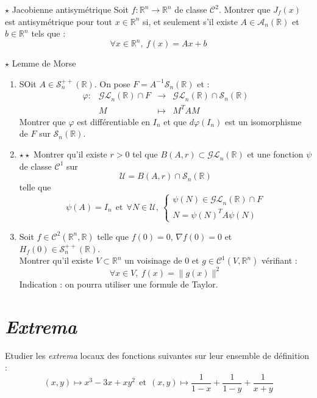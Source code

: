 \documentclass[french,a4paper]{article}
\newcommand{\R}{\mathbb{R}}
\newcommand{\inv}{^{-1}}
\theoremstyle{plain}
\theoremstyle{definition}
\theoremstyle{remark}
\begin{document}
\begin{ex}[Nougayrède / X]{$\star$ Jacobienne antisymétrique}
	Soit $f:\R^n\to\R^n$ de classe $\mathcal{C}^2$. Montrer que $J_f(x)$ est antisymétrique pour tout $x\in\R^n$ si, et seulement s'il existe $A\in\mathcal{A}_n(\R)$ et $b\in\R^n$ tels que : $$\forall x\in\R^n,\ f(x)=Ax+b$$
\end{ex}

\begin{ex}{$\star$ Lemme de Morse}
	\begin{enumerate}
		\item SOit $A\in\mathcal{S}_n^{++}(\R)$. On pose $F=A\inv\mathcal{S}_n(\R)$ et : $$\begin{array}{lrcl}
			\varphi:&\mathcal{GL}_n(\R)\cap F&\longrightarrow&\mathcal{GL}_n(\R)\cap\mathcal{S}_n(\R)\\
			&M&\longmapsto&M^TAM
		\end{array}$$ Montrer que $\varphi$ est différentiable en $I_n$ et que $d\varphi(I_n)$ est un isomorphisme de $F$ sur $\mathcal{S}_n(\R)$.
		\item $\star\star$ Montrer qu'il existe $r>0$ tel que $B(A,r)\subset\mathcal{GL}_n(\R)$ et une fonction $\psi$ de classe $\mathcal{C}^1$ sur $$\mathcal{U}=B(A,r)\cap\mathcal{S}_n(\R)$$ telle que $$\psi(A)=I_n\ \ \text{et}\ \ \forall N\in \mathcal{U},\ \begin{cases}
			\psi(N)\in\mathcal{GL}_n(\R)\cap F\\
			N=\psi(N)^TA\psi(N)
		\end{cases}$$
		\item Soit $f\in\mathcal{C}^2(\R^n,\R)$ telle que $f(0)=0$, $\nabla f(0)=0$ et $H_f(0)\in\mathcal{S}_n^{++}(\R)$. \\
		Montrer qu'il existe $V\subset\R^n$ un voisinage de $0$ et $g\in\mathcal{C}^1(V,\R^n)$ vérifiant : $$\forall x\in V,\ f(x)=\lVert g(x)\rVert^2$$ Indication : on pourra utiliser une formule de Taylor.
	\end{enumerate}
\end{ex}

\section{\textit{Extrema}}

\begin{ex}[Moulin.32]{}
	Etudier les \textit{extrema} locaux des fonctions suivantes sur leur ensemble de définition : $$(x,y)\mapsto x^3-3x+xy^2 \ \ \text{et}\ \ (x,y)\mapsto\frac{1}{1-x}+\frac{1}{1-y}+\frac{1}{x+y}$$
\end{ex}
\end{document}
